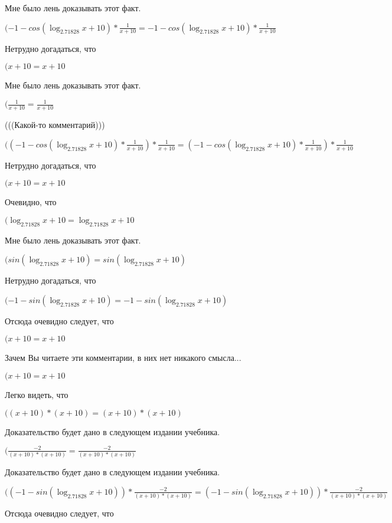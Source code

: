 \documentclass[12pt,a4paper,fleqn]{article}
\theoremstyle{definition}
\begin{document}
Мне было лень доказывать этот факт.

$( -1  - cos(\log_{ 2.71828 }{ x  +  10 }) * \frac{ 1 }{ x  +  10 }
 =  -1  - cos(\log_{ 2.71828 }{ x  +  10 }) * \frac{ 1 }{ x  +  10 }
$

Нетрудно догадаться, что

$( x  +  10  =  x  +  10 $

Мне было лень доказывать этот факт.

$(\frac{ 1 }{ x  +  10 }
 = \frac{ 1 }{ x  +  10 }
$

(((Какой-то комментарий)))

$(( -1  - cos(\log_{ 2.71828 }{ x  +  10 }) * \frac{ 1 }{ x  +  10 }
) * \frac{ 1 }{ x  +  10 }
 = ( -1  - cos(\log_{ 2.71828 }{ x  +  10 }) * \frac{ 1 }{ x  +  10 }
) * \frac{ 1 }{ x  +  10 }
$

Нетрудно догадаться, что

$( x  +  10  =  x  +  10 $

Очевидно, что

$(\log_{ 2.71828 }{ x  +  10 } = \log_{ 2.71828 }{ x  +  10 }$

Мне было лень доказывать этот факт.

$(sin(\log_{ 2.71828 }{ x  +  10 }) = sin(\log_{ 2.71828 }{ x  +  10 })$

Нетрудно догадаться, что

$( -1  - sin(\log_{ 2.71828 }{ x  +  10 }) =  -1  - sin(\log_{ 2.71828 }{ x  +  10 })$

Отсюда очевидно следует, что

$( x  +  10  =  x  +  10 $

Зачем Вы читаете эти комментарии, в них нет никакого смысла...

$( x  +  10  =  x  +  10 $

Легко видеть, что

$(( x  +  10 ) * ( x  +  10 ) = ( x  +  10 ) * ( x  +  10 )$

Доказательство будет дано в следующем издании учебника.

$(\frac{ -2 }{( x  +  10 ) * ( x  +  10 )}
 = \frac{ -2 }{( x  +  10 ) * ( x  +  10 )}
$

Доказательство будет дано в следующем издании учебника.

$(( -1  - sin(\log_{ 2.71828 }{ x  +  10 })) * \frac{ -2 }{( x  +  10 ) * ( x  +  10 )}
 = ( -1  - sin(\log_{ 2.71828 }{ x  +  10 })) * \frac{ -2 }{( x  +  10 ) * ( x  +  10 )}
$

Отсюда очевидно следует, что
\end{document}
